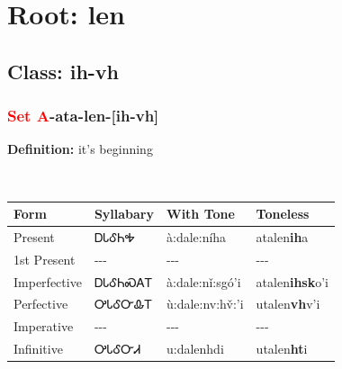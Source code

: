 \needspace{4in}
\section*{Root: len}
\nopagebreak
{}
\needspace{3in}
\subsection*{Class: ih-vh}
\nopagebreak
\needspace{2in}
\subsubsection*{\textcolor{Red}{Set A}{-}ata{-}\textbf{len}{-}[ih-vh]}
\nopagebreak
\textbf{Definition: } it{\textquoteright}s beginning
\\[0.5em]
\begin{tabularx}{\textwidth}{l X X X}%
\toprule%
\textbf{Form}&\textbf{Syllabary}&\textbf{With Tone}&\textbf{Toneless}\\%
\midrule%
Present&ᎠᏓᎴᏂᎭ&à:dale:níha&atalen\textbf{ih}a\\%
1st Present&{-}{-}{-}&{-}{-}{-}&{-}{-}{-}\\%
Imperfective&ᎠᏓᎴᏂᏍᎪᎢ&à:dale:nǐ:sgó’i&atalen\textbf{ihsk}o'i\\%
Perfective&ᎤᏓᎴᏅᎲᎢ&ù:dale:nv:hv̌:’i&utalen\textbf{vh}v'i\\%
Imperative&{-}{-}{-}&{-}{-}{-}&{-}{-}{-}\\%
Infinitive&ᎤᏓᎴᏅᏗ&u:dalenhdi&utalen\textbf{ht}i\\%
\bottomrule%
\end{tabularx}
\\[1em]